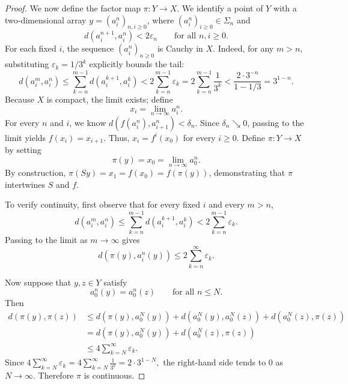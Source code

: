 \documentclass[12pt]{amsart}
\theoremstyle{definition}
\numberwithin{equation}{section}
\theoremstyle{remark}
\begin{document}
\begin{proof}
We now define the factor map $\pi: Y \to X$. We identify a point of $Y$ with a two-dimensional array $y = (a_i^n)_{n,i\geq 0}$, where $(a_i^n)_{i\geq 0} \in \Sigma_n$ and
\[
        d(a_i^{n+1}, a_i^n) < 2\varepsilon_n
        \qquad\text{for all } n, i \geq 0.
\]
For each fixed $i$, the sequence $(a_i^n)_{n\geq 0}$ is Cauchy in $X$. Indeed, for any $m > n$, substituting $\varepsilon_k = 1/3^k$ explicitly bounds the tail:
\[
        d(a_i^m, a_i^n)
        \leq
        \sum_{k=n}^{m-1} d(a_i^{k+1}, a_i^k)
        <
        2\sum_{k=n}^{m-1} \varepsilon_k
        =
        2\sum_{k=n}^{m-1} \frac{1}{3^k}
        <
        \frac{2 \cdot 3^{-n}}{1 - 1/3}
        =
        3^{1-n}.
\]
Because $X$ is compact, the limit exists; define
\[
        x_i = \lim_{n\to\infty} a_i^n.
\]
For every $n$ and $i$, we know $d(f(a_i^n), a_{i+1}^n) < \delta_n$. Since $\delta_n \searrow 0$, passing to the limit yields $f(x_i) = x_{i+1}$. Thus, $x_i = f^i(x_0)$ for every $i \geq 0$. Define $\pi: Y \to X$ by setting
\[
        \pi(y) = x_0 = \lim_{n\to\infty} a_0^n.
\]
By construction, $\pi(Sy) = x_1 = f(x_0) = f(\pi(y))$, demonstrating that $\pi$ intertwines $S$ and $f$.

To verify continuity, first observe that for every fixed $i$ and every $m>n$,
\[
d(a_i^m,a_i^n)
\le
\sum_{k=n}^{m-1} d(a_i^{k+1},a_i^k)
<
2\sum_{k=n}^{m-1}\varepsilon_k .
\]
Passing to the limit as $m\to\infty$ gives
\[
d(\pi(y),a_i^n(y))
\le
2\sum_{k=n}^{\infty}\varepsilon_k .
\]

Now suppose that $y,z\in Y$ satisfy
\[
a_0^n(y)=a_0^n(z)
\qquad
\text{for all } n\le N .
\]
Then
\[
\begin{aligned}
d(\pi(y),\pi(z))
&\le
d(\pi(y),a_0^N(y))
+d(a_0^N(y),a_0^N(z))
+d(a_0^N(z),\pi(z))\\
&=
d(\pi(y),a_0^N(y))
+d(a_0^N(z),\pi(z))\\
&\le
4\sum_{k=N}^{\infty}\varepsilon_k.
\end{aligned}
\]
Since
$
4\sum_{k=N}^{\infty}\varepsilon_k
=
4\sum_{k=N}^{\infty}\frac1{3^k}
=
2\cdot3^{1-N},
$
the right-hand side tends to $0$ as $N\to\infty$. Therefore $\pi$ is continuous.


\end{proof}
\end{document}
